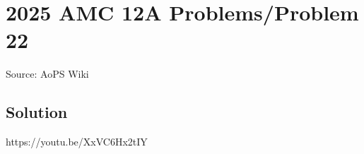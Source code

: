 \documentclass[12pt]{article}
\begin{document}
\section*{{2025 AMC 12A Problems/Problem 22}}
Source: AoPS Wiki

\subsection*{Solution}
https://youtu.be/XxVC6Hx2tIY
\end{document}
